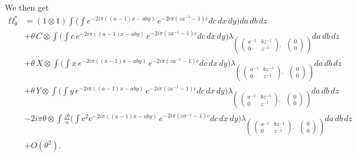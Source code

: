 \documentclass[a4paper,11pt,reqno]{amsart}
\numberwithin{equation}{section}
\theoremstyle{remark}
\theoremstyle{definition}
\begin{document}
We then get
\begin{align*}
\Omega^*_\theta&=(1\otimes 1)\int \bigg(\int e^{-2i\pi((a-1)x-aby)}\, e^{-2i\pi(za^{-1}-1)c}
dc\,dx\,dy\bigg) da\,db\,dz\\
&+ \theta\, C\otimes\int \bigg(\int c\, e^{-2i\pi((a-1)x-aby)}\,
e^{-2i\pi(za^{-1}-1)c}dc\,dx\,dy\bigg)\lambda_{\begin{pmatrix} \begin{pmatrix}a^{-1}&bz^{-1}\\0&z^{-1}\end{pmatrix},&\!\!\!\!\begin{pmatrix}0\\0\end{pmatrix}\end{pmatrix}}
 da\,db\,dz\\
&+  \theta\, X\otimes\int\bigg(\int x\, e^{-2i\pi((a-1)x-aby)}\,
e^{-2i\pi(za^{-1}-1)c}dc\,dx\,dy\bigg)\lambda_{\begin{pmatrix} \begin{pmatrix}a^{-1}&bz^{-1}\\0&z^{-1}\end{pmatrix},&\!\!\!\!\begin{pmatrix}0\\0\end{pmatrix}\end{pmatrix}}
 da\,db\,dz\\
&+  \theta\, Y\otimes\int\bigg(\int y\, e^{-2i\pi((a-1)x-aby)}\,
e^{-2i\pi(za^{-1}-1)c}dc\,dx\,dy\bigg)\lambda_{\begin{pmatrix} \begin{pmatrix}a^{-1}&bz^{-1}\\0&z^{-1}\end{pmatrix},&\!\!\!\!\begin{pmatrix}0\\0\end{pmatrix}\end{pmatrix}}
 da\,db\,dz\\
&-2i\pi \theta\otimes\int \frac{zb}a \bigg(\int c^2
e^{-2i\pi((a-1)x-aby)}\,
e^{-2i\pi(za^{-1}-1)c}dc\,dx\,dy\bigg)
\lambda_{\begin{pmatrix} \begin{pmatrix}a^{-1}&bz^{-1}\\0&z^{-1}\end{pmatrix},&\!\!\!\!\begin{pmatrix}0\\0\end{pmatrix}\end{pmatrix}}
 da\,db\,dz\\
&+ O(\theta^2).
\end{align*}
\end{document}
